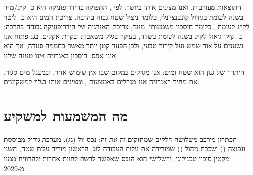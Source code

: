 התוצאות מעורבות, ואנו מציגים אותן ביושר. לפי \cite{barbosa2015}, התפוקה בהידרופוניקה היא כ-\RRhydroYield{} ק״ג/מ״ר בשנה לעומת \RRfieldYield{} בגידול קונבנציונלי, כלומר ניצול שטח גבוה בהרבה. צריכת המים היא כ-\RRhydroWater{} ליטר לק״ג לעומת \RRfieldWater{}, כלומר חיסכון משמעותי. מנגד, צריכת האנרגיה של הידרופוניקה גבוהה בהרבה: כ-\RRhydroEnergy{} קילו-ג׳אול לק״ג בשנה לעומת \RRfieldEnergy{} בשדה, בעיקר בגלל משאבות ובקרת אקלים. בגג פתוח אנו נשענים על אור שמש ועל קירור טבעי, ולכן הפער קטן יותר מאשר בחממה סגורה, אך הוא אינו אפס. חיסכון באנרגיה אינו טענה שלנו.

\begin{insightbox}
היתרון של גגון הוא שטח ומים: אנו מגדלים במקום שבו אין שימוש אחר, ובמעגל מים סגור. את מחיר האנרגיה אנו מנהלים באמצעות , ומציגים אותו בגלוי למשקיעים.
\end{insightbox}

\section{מה המשמעות למשקיע}
הפתרון מורכב משלושה חלקים שמחזקים זה את זה: נכס זול (גג), מערכת גידול מבוססת ונפוצה () \cite{resh2012} ושכבת ניהול () שמורידה את עלות העבודה לגג. הראשון מוריד עלות שטח, השני מקטין סיכון טכנולוגי, והשלישי הוא הנכס שאפשר לרשת לחוות אחרות ולהרוויח ממנו מ-2029.

